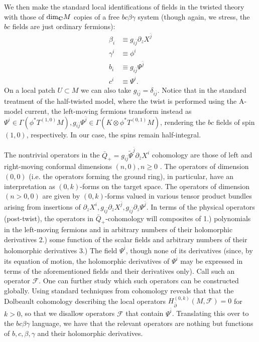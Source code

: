 \documentclass[../main.tex]{subfiles}
\begin{document}
We then make the standard local identifications of fields in the twisted theory with those of ${\rm dim}_{\mathbf{C}}M$ copies of a free $bc\beta\gamma$ system (though again, we stress, the $bc$ fields are just ordinary fermions):
\begin{align*}
\beta_i &\equiv g_{i \bar{j}}\partial_z X^{\bar{j}} \\
\gamma^i &\equiv \phi^i \\
b_i &\equiv g_{i \bar{j}} \Psi^{\bar{j}} \\
c^i &\equiv \Psi^i.
\end{align*}
On a local patch $U \subset M$ we can also take $g_{i\bar{j}} = \delta_{i \bar{j}}$.
Notice that in the standard treatment of the half-twisted model, where the twist is performed using the A-model current, the left-moving fermions transform instead as $\Psi^i \in \Gamma(\phi^* T^{(1, 0)}M), g_{i \bar{j}}\Psi^{\bar{j}} \in \Gamma(K \otimes \phi^* T^{(0, 1)}M)$, rendering the $bc$ fields of spin $(1, 0)$, respectively. In our case, the spins remain half-integral.

The nontrivial operators in the $\bar{Q}_+ = g_{i \bar{j}}\tilde{\Psi}^{\bar{j}} \partial_{\bar{z}}X^i$ cohomology are those of left and right-moving conformal dimensions $(n, 0), n \geq 0$ \cite{Tan,CostelloHol,ESW}. 
The operators of dimension $(0, 0)$ (i.e. the operators forming the ground ring), in particular, have an interpretation as $(0,k)$-forms on the target space. 
The operators of dimension $(n > 0, 0)$ are given by $(0, k)$-forms valued in various tensor product bundles arising from insertions of $\partial_z X^i, g_{i \bar{j}}\partial_z X^{\bar{j}}, g_{i \bar{j}}\partial_z \Psi^{\bar{j}}$. In terms of the physical operators (post-twist), the operators in $\bar{Q}_+$-cohomology will composites of 1.) polynomials in the left-moving fermions and in arbitrary numbers of their holomorphic derivatives 2.) some function of the scalar fields and arbitrary numbers of their holomorphic derivatives 3.) The field $\Psi^{\bar{i}}$, though none of its derivatives (since, by its equation of motion, the holomorphic derivatives of $\Psi^{\bar{i}}$ may be expressed in terms of the aforementioned fields and their derivatives only). Call such an operator $\mathcal{F}$. One can further study which such operators can be constructed globally. Using standard techniques from cohomology reveals that that the Dolbeault cohomology describing the local operators $H_{\bar{\partial}}^{(0,k)}(M, \mathcal{F})=0$ for $k>0$, so that we disallow operators $\mathcal{F}$ that contain $\Psi^{\bar{i}}$. Translating this over to the $bc\beta\gamma$ language, we have that the relevant operators are nothing but functions of $b, c, \beta, \gamma$ and their holomorphic derivatives.
\end{document}
